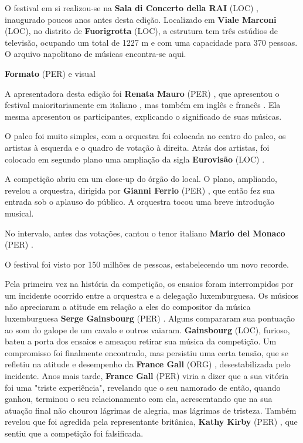 \documentclass[12pt,a4paper]{article}
\begin{document}
O festival em si realizou-se na \textbf{Sala di Concerto della RAI} (LOC) , inaugurado poucos anos antes desta edição. Localizado em \textbf{Viale Marconi} (LOC), no distrito de \textbf{Fuorigrotta} (LOC), a estrutura tem três estúdios de televisão, ocupando um total de 1227 m e com uma capacidade para 370 pessoas. O arquivo napolitano de músicas encontra-se aqui.



\textbf{Formato} (PER) e visual

A apresentadora desta edição foi \textbf{Renata Mauro} (PER) , que apresentou o festival maioritariamente em italiano , mas também em inglês e francês . Ela mesma apresentou os participantes, explicando o significado de suas músicas.

O palco foi muito simples, com a orquestra foi colocada no centro do palco, os artistas à esquerda e o quadro de votação à direita. Atrás dos artistas, foi colocado em segundo plano uma ampliação da sigla \textbf{Eurovisão} (LOC) .

A competição abriu em um close-up do órgão do local. O plano, ampliando, revelou a orquestra, dirigida por \textbf{Gianni Ferrio} (PER) , que então fez sua entrada sob o aplauso do público. A orquestra tocou uma breve introdução musical.

No intervalo, antes das votações, cantou o tenor italiano \textbf{Mario del Monaco} (PER) .

O festival foi visto por 150 milhões de pessoas, estabelecendo um novo recorde.

Pela primeira vez na história da competição, os ensaios foram interrompidos por um incidente ocorrido entre a orquestra e a delegação luxemburguesa. Os músicos não apreciaram a atitude em relação a eles do compositor da música luxemburguesa \textbf{Serge Gainsbourg} (PER) . Alguns compararam sua pontuação ao som do galope de um cavalo e outros vaiaram. \textbf{Gainsbourg} (LOC), furioso, bateu a porta dos ensaios e ameaçou retirar sua música da competição. Um compromisso foi finalmente encontrado, mas persistiu uma certa tensão, que se refletiu na atitude e desempenho da \textbf{France Gall} (ORG) , desestabilizada pelo incidente. Anos mais tarde, \textbf{France Gall} (PER) viria a dizer que a sua vitória foi uma "triste experiência", revelando que o seu namorado de então, quando ganhou, terminou o seu relacionamento com ela, acrescentando que na sua atuação final não chourou lágrimas de alegria, mas lágrimas de tristeza. Também revelou que foi agredida pela representante britânica, \textbf{Kathy Kirby} (PER) , que sentiu que a competição foi falsificada.
\end{document}
